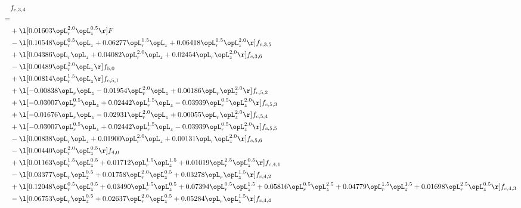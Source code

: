 \begin{alignat}{2} 
\label{eq:f_34_2} 
& f_{c,3,4} \nonumber \\ 
 = \\ 
& + \l[  0.01603 \opL_r^{2.0} \opL_z^{0.5}  \r] F \nonumber \\ 
& - \l[  0.10548 \opL_r^{0.5} \opL_z +  0.06277 \opL_r^{1.5} \opL_z +  0.06418 \opL_r^{0.5} \opL_z^{2.0}  \r] f_{c,3,5} \nonumber \\ 
& + \l[  0.04386 \opL_r \opL_z +  0.04082 \opL_r^{2.0} \opL_z +  0.02454 \opL_r \opL_z^{2.0}  \r] f_{c,3,6} \nonumber \\ 
& - \l[  0.00489 \opL_r^{2.0} \opL_z  \r] f_{5,0} \nonumber \\ 
& + \l[  0.00814 \opL_r^{1.5} \opL_z  \r] f_{c,5,1} \nonumber \\ 
& + \l[  -0.00838 \opL_r \opL_z   -0.01954 \opL_r^{2.0} \opL_z +  0.00186 \opL_r \opL_z^{2.0}  \r] f_{c,5,2} \nonumber \\ 
& + \l[  -0.03007 \opL_r^{0.5} \opL_z +  0.02442 \opL_r^{1.5} \opL_z   -0.03939 \opL_r^{0.5} \opL_z^{2.0}  \r] f_{c,5,3} \nonumber \\ 
& + \l[  -0.01676 \opL_r \opL_z   -0.02931 \opL_r^{2.0} \opL_z +  0.00055 \opL_r \opL_z^{2.0}  \r] f_{c,5,4} \nonumber \\ 
& + \l[  -0.03007 \opL_r^{0.5} \opL_z +  0.02442 \opL_r^{1.5} \opL_z   -0.03939 \opL_r^{0.5} \opL_z^{2.0}  \r] f_{c,5,5} \nonumber \\ 
& - \l[  0.00838 \opL_r \opL_z +  0.01900 \opL_r^{2.0} \opL_z +  0.00131 \opL_r \opL_z^{2.0}  \r] f_{c,5,6} \nonumber \\ 
& - \l[  0.00440 \opL_r^{2.0} \opL_z^{0.5}  \r] f_{4,0} \nonumber \\ 
& + \l[  0.01163 \opL_r^{1.5} \opL_z^{0.5} +  0.01712 \opL_r^{1.5} \opL_z^{1.5} +  0.01019 \opL_r^{2.5} \opL_z^{0.5}  \r] f_{c,4,1} \nonumber \\ 
& - \l[  0.03377 \opL_r \opL_z^{0.5} +  0.01758 \opL_r^{2.0} \opL_z^{0.5} +  0.03278 \opL_r \opL_z^{1.5}  \r] f_{c,4,2} \nonumber \\ 
& + \l[  0.12048 \opL_r^{0.5} \opL_z^{0.5} +  0.03490 \opL_r^{1.5} \opL_z^{0.5} +  0.07394 \opL_r^{0.5} \opL_z^{1.5} +  0.05816 \opL_r^{0.5} \opL_z^{2.5} +  0.04779 \opL_r^{1.5} \opL_z^{1.5} +  0.01698 \opL_r^{2.5} \opL_z^{0.5}  \r] f_{c,4,3} \nonumber \\ 
& - \l[  0.06753 \opL_r \opL_z^{0.5} +  0.02637 \opL_r^{2.0} \opL_z^{0.5} +  0.05284 \opL_r \opL_z^{1.5}  \r] f_{c,4,4} \nonumber \\ 

\end{alignat}

